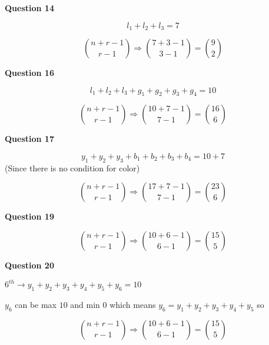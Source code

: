 \documentclass[11pt]{article}
\begin{document}
\textbf{Question 14}

$$l_1 + l_2 + l_3 = 7$$

$${n+r-1 \choose r-1} \Rightarrow {7+3-1 \choose 3-1} = {9 \choose 2}$$

\textbf{Question 16}

$$l_1 + l_2 + l_3 + g_1 + g_2 + g_3 + g_4 = 10$$

$${n+r-1 \choose r-1} \Rightarrow {10+7-1 \choose 7-1} = {16 \choose 6}$$ 

\textbf{Question 17}

$$y_1 + y_2 + y_3 + b_1 + b_2 + b_3 + b_4 = 10 + 7 $$(Since there is no condition for color)
 
$${n+r-1 \choose r-1} \Rightarrow {17+7-1 \choose 7-1} = {23 \choose 6}$$ 
 
\textbf{Question 19}

$${n+r-1 \choose r-1} \Rightarrow {10+6-1 \choose 6-1} = {15 \choose 5}$$ 
 
 \textbf{Question 20}
 
 $6^{th} \rightarrow y_1 + y_2 + y_3 + y_4 + y_5 + y_6 = 10$
 
 $y_6$ can be max $10$ and min $0$ which means $y_6 = y_1 + y_2 + y_3 + y_4 + y_5$ so
 
 $${n+r-1 \choose r-1} \Rightarrow {10+6-1 \choose 6-1} = {15 \choose 5}$$ 
 
\end{document}
